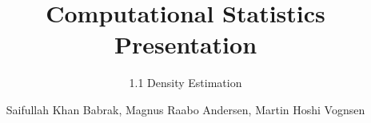 \makeatletter
{}

\makeatother

%



\title[] %
{Computational Statistics\\Presentation}
\subtitle{1.1 Density Estimation}
\author[] %
{Saifullah Khan Babrak, Magnus Raabo Andersen, Martin Hoshi Vognsen}
\institute[KU SCIENCE] %
{

}
\date[] %
{}
\subject{}






\setcounter{framenumber}{-1}
\frame{\titlepage}


